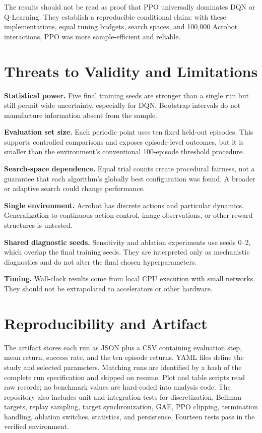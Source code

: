\documentclass[11pt]{article}
\begin{document}
The results should not be read as proof that PPO universally dominates DQN or
Q-Learning. They establish a reproducible conditional claim: with these
implementations, equal tuning budgets, search spaces, and 100,000 Acrobot
interactions, PPO was more sample-efficient and reliable.

\section{Threats to Validity and Limitations}

\textbf{Statistical power.} Five final training seeds are stronger than a single
run but still permit wide uncertainty, especially for DQN. Bootstrap intervals do
not manufacture information absent from the sample.

\textbf{Evaluation set size.} Each periodic point uses ten fixed held-out episodes.
This supports controlled comparisons and exposes episode-level outcomes, but it
is smaller than the environment's conventional 100-episode threshold procedure.

\textbf{Search-space dependence.} Equal trial counts create procedural fairness,
not a guarantee that each algorithm's globally best configuration was found. A
broader or adaptive search could change performance.

\textbf{Single environment.} Acrobot has discrete actions and particular dynamics.
Generalization to continuous-action control, image observations, or other reward
structures is untested.

\textbf{Shared diagnostic seeds.} Sensitivity and ablation experiments use seeds
0--2, which overlap the final training seeds. They are interpreted only as
mechanistic diagnostics and do not alter the final chosen hyperparameters.

\textbf{Timing.} Wall-clock results come from local CPU execution with small
networks. They should not be extrapolated to accelerators or other hardware.

\section{Reproducibility and Artifact}

The artifact stores each run as JSON plus a CSV containing evaluation step, mean
return, success rate, and the ten episode returns. YAML files define the study and
selected parameters. Matching runs are identified by a hash of the complete run
specification and skipped on resume. Plot and table scripts read raw records; no
benchmark values are hard-coded into analysis code. The repository also includes
unit and integration tests for discretization, Bellman targets, replay sampling,
target synchronization, GAE, PPO clipping, termination handling, ablation switches,
statistics, and persistence. Fourteen tests pass in the verified environment.
\end{document}
